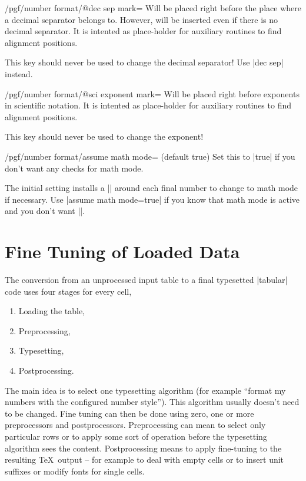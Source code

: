 \begin{key}{/pgf/number format/@dec sep mark=}
	Will be placed right before the place where a decimal separator belongs to. However,  will be inserted even if there is no decimal separator. It is intented as place-holder for auxiliary routines to find alignment positions.

	This key should never be used to change the decimal separator! Use |dec sep| instead. 
\end{key}

\begin{key}{/pgf/number format/@sci exponent mark=}
	Will be placed right before exponents in scientific notation. It is intented as place-holder for auxiliary routines to find alignment positions.

	This key should never be used to change the exponent!
\end{key}

\begin{key}{/pgf/number format/assume math mode= (default true)}
	Set this to |true| if you don't want any checks for math mode.
	
	The initial setting installs a |\pgfutilensuremath| around each final number to change to math mode if necessary. Use |assume math mode=true| if you know that math mode is active and you don't want |\pgfutilensuremath|.
\end{key}




\section{Fine Tuning of Loaded Data}
The conversion from an unprocessed input table to a final typesetted |tabular| code uses four stages for every cell,
\begin{enumerate}
	\item Loading the table,
	\item Preprocessing,
	\item Typesetting,
	\item Postprocessing.
\end{enumerate}
The main idea is to select one typesetting algorithm (for example ``format my numbers with the configured number style''). This algorithm usually doesn't need to be changed. Fine tuning can then be done using zero, one or more preprocessors and postprocessors. Preprocessing can mean to select only particular rows or to apply some sort of operation before the typesetting algorithm sees the content. Postprocessing means to apply fine-tuning to the resulting \TeX\ output -- for example to deal with empty cells or to insert unit suffixes or modify fonts for single cells.

